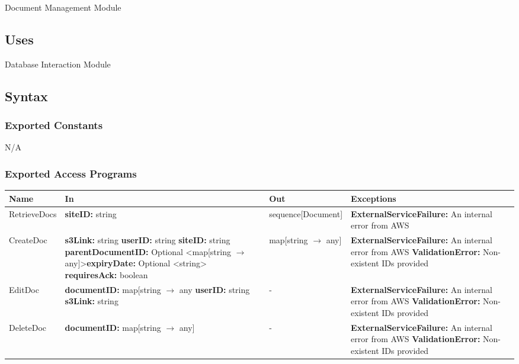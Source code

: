 \documentclass[12pt, titlepage]{article}
\begin{document}
Document Management Module

\subsection{Uses}

Database Interaction Module

\subsection{Syntax}

\subsubsection{Exported Constants}

N/A

\subsubsection{Exported Access Programs}

\begin{center}
  \begin{tabular}{>{\raggedright}p{3cm} >{\raggedright}p{5cm}
    >{\raggedright}p{4cm} p{4cm}}
    \hline
    \textbf{Name} & \textbf{In} & \textbf{Out} & \textbf{Exceptions} \\
    \hline
    RetrieveDocs & \textbf{siteID:} string & sequence[Document] &
    \textbf{ExternalServiceFailure:} An internal error from AWS \\
    \hline
    CreateDoc & \textbf{s3Link:} string \newline \textbf{userID:}
    string \newline \textbf{siteID:} string \newline
    \textbf{parentDocumentID:} Optional \textless map[string
    $\rightarrow$ any]\textgreater \newline \textbf{expiryDate:}
    Optional \textless string\textgreater \newline
    \textbf{requiresAck:} boolean & map[string $\rightarrow$ any] &
    \textbf{ExternalServiceFailure:} An internal error from AWS \newline
    \textbf{ValidationError:} Non-existent IDs provided \\
    \hline
    EditDoc & \textbf{documentID:} map[string $\rightarrow$ any
      \newline \textbf{userID:} string \newline
      \textbf{s3Link:}
      string & - &
      \textbf{ExternalServiceFailure:} An internal error from AWS \newline
      \textbf{ValidationError:} Non-existent IDs provided \\
      \hline
      DeleteDoc & \textbf{documentID:} map[string $\rightarrow$ any] & - &
      \textbf{ExternalServiceFailure:} An internal error from AWS \newline
      \textbf{ValidationError:} Non-existent IDs provided \\
      \hline
    \end{tabular}
  \end{center}
\end{document}
